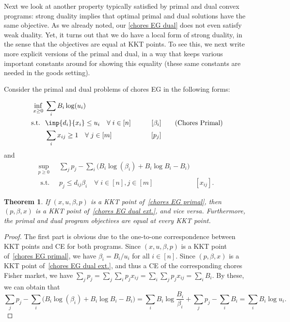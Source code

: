 \documentclass[format=acmsmall,authorversion]{acmart}
\newtheorem{theorem}{Theorem}
\begin{document}
Next we look at another property typically satisfied by primal and dual convex programs: strong duality implies that optimal primal and dual solutions have the same objective. As we already noted, our \ref{chores EG dual} does not even satisfy weak duality. Yet, it turns out that we do have a local form of strong duality, in the sense that the objectives are equal at KKT points. To see this, we next write more explicit versions of the primal and dual, in a way that keeps various important constants around for showing this equality (these same constants are needed in the goods setting).

Consider the primal and dual problems of chores EG in the following forms: 

\begin{equation}
    \begin{aligned}
    \inf_{x \geq 0} \; & \sum_i B_i \log(u_i) \\ 
    \text{ s.t. } \; & \inp{d_i}{x_i} \leq u_i \quad \forall\; i \in [n] & \quad [\beta_i]\\ 
    & \sum_i x_{ij} \geq 1 \quad \forall\; j \in [m] & \hspace{20pt} [p_j]
    \end{aligned} 
    \label{chores EG primal} 
    \tag{Chores Primal}
\end{equation}
and 
\begin{equation}
    \begin{aligned}
    \sup_{p \geq 0} \; & \sum_j p_j - \sum_i \Big( B_i \log(\beta_i) + B_i \log{B_i} - B_i \Big) \\
    \text{ s.t. } \; & p_j \leq d_{ij} \beta_i \quad \forall\; i \in [n], j \in [m] & [x_{ij}].
    \end{aligned} 
    \label{chores EG dual ext.} 
    \tag{Chores Dual'}
\end{equation}


\begin{theorem}
    If $(x, u, \beta, p)$ is a KKT point of~\ref{chores EG primal}, then $(p, \beta, x)$ is a KKT point of~\ref{chores EG dual ext.}, and vice versa. 
    Furthermore, the primal and dual program objectives are equal at every KKT point.
\end{theorem} 

\begin{proof}
    The first part is obvious due to the one-to-one correspondence between KKT points and CE for both programs. 
    Since $(x, u, \beta, p)$ is a KKT point of~\ref{chores EG primal}, we have $\beta_i = B_i / u_i$ for all $i \in [n]$. 
    Since $(p, \beta, x)$ is a KKT point of~\ref{chores EG dual ext.}, and thus a CE of the corresponding chores Fisher market, we have $\sum_j p_j = \sum_j \sum_i p_j x_{ij} = \sum_i \sum_j p_j x_{ij} = \sum_i B_i$. By these, we can obtain that 
    \begin{equation*}
        \sum_j p_j - \sum_i \Big( B_i \log(\beta_i) + B_i \log{B_i} - B_i \Big) = \sum_i B_i \log{\frac{B_i}{\beta_i}} + \sum_j p_j - \sum_i B_i = \sum_i B_i \log{u_i}.
    \end{equation*}
\end{proof}
\end{document}
